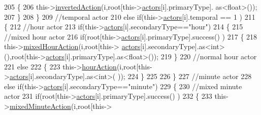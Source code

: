 \begin{DoxyCode}
205                     \{
206                         this->\hyperlink{class_jetpack_adacfc35fab4a621357caf98ce1c9cb54}{invertedAction}(i,root[this->\hyperlink{class_jetpack_a7e16d2f97837f9712a2e6de1c50d99db}{actors}[i].primaryType].
      as<float>());          
207                     \}
208                 \}
209                 \textcolor{comment}{//temporal actor}
210                 \textcolor{keywordflow}{else} \textcolor{keywordflow}{if}(this->\hyperlink{class_jetpack_a7e16d2f97837f9712a2e6de1c50d99db}{actors}[i].temporal == 1 )
211                 \{
212                     \textcolor{comment}{//hour actor}
213                     \textcolor{keywordflow}{if}(this->\hyperlink{class_jetpack_a7e16d2f97837f9712a2e6de1c50d99db}{actors}[i].secondaryType==\textcolor{stringliteral}{"hour"})
214                     \{
215                         \textcolor{comment}{//mixed hour actor}
216                         \textcolor{keywordflow}{if}(root[this->\hyperlink{class_jetpack_a7e16d2f97837f9712a2e6de1c50d99db}{actors}[i].primaryType].success() )
217                         \{
218                             this->\hyperlink{class_jetpack_ac1a49ab4867718cdb415ad74c2066b9d}{mixedHourAction}(i,root[this->
      \hyperlink{class_jetpack_a7e16d2f97837f9712a2e6de1c50d99db}{actors}[i].secondaryType].as<int>(),root[this->\hyperlink{class_jetpack_a7e16d2f97837f9712a2e6de1c50d99db}{actors}[i].primaryType].as<float>());
219                         \}
220                         \textcolor{comment}{//normal hour actor}
221                         \textcolor{keywordflow}{else}
222                         \{
223                             this->\hyperlink{class_jetpack_acd6889af2fe5b057c6bd51b6dac827ef}{hourAction}(i,root[this->\hyperlink{class_jetpack_a7e16d2f97837f9712a2e6de1c50d99db}{actors}[i].secondaryType].as<int>(
      ));
224                         \}
225                     
226                     \}
227                     \textcolor{comment}{//minute actor}
228                     \textcolor{keywordflow}{else} \textcolor{keywordflow}{if}(this->\hyperlink{class_jetpack_a7e16d2f97837f9712a2e6de1c50d99db}{actors}[i].secondaryType==\textcolor{stringliteral}{"minute"})
229                     \{
230                         \textcolor{comment}{//mixed minute actor}
231                         \textcolor{keywordflow}{if}(root[this->\hyperlink{class_jetpack_a7e16d2f97837f9712a2e6de1c50d99db}{actors}[i].primaryType].success() )
232                         \{
233                             this->\hyperlink{class_jetpack_acf8ed1fb594b9e8e224f4ed872a8e093}{mixedMinuteAction}(i,root[this->

\end{DoxyCode}
